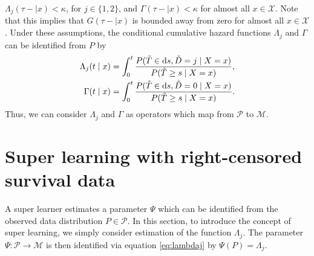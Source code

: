 \documentclass[a4,danish]{article}
\begin{document}
\(\Lambda_{j}(\tau- \mid x)<\kappa \), for \(j\in\{1,2\}\), and
\(\Gamma(\tau- \mid x)<\kappa\) for almost all \(x\in\mathcal X\). Note that this
implies that \(G(\tau- \mid x)\) is bounded away from zero for almost all \(x\in\mathcal X\).
Under these assumptions, the conditional cumulative hazard functions
\(\Lambda_{j}\) and \(\Gamma\) can be identified from \(P\) by
\begin{align}
  \Lambda_{j}(t \mid x) &= \int_0^t\frac{  P(\tilde T \in \mathop{}\!\mathrm{d} s, \tilde D=j \mid X=x )}{P(\tilde T \geq s \mid X=x )}, \label{eq:lambdaj}\\
  \Gamma(t \mid x) &= \int_0^t\frac{  P(\tilde T \in \mathop{}\!\mathrm{d} s, \tilde D=0 \mid X=x )}{P(\tilde T \geq s \mid X=x )}\label{eq:gamma}.
\end{align}
Thus, we can consider $\Lambda_j$ and \(\Gamma\) as operators which map from
\( \mathcal{P} \) to \(\mathcal M\).
 
\section{Super learning with right-censored survival data}
\label{sec:super-learning}

A super learner estimates a parameter $\Psi$ which can be identified from the
observed data distribution \(P\in\mathcal P\). In this section, to introduce the
concept of super learning, we simply consider estimation of the function
\( \Lambda_{j}\). The parameter \(\Psi:\mathcal P\to\mathcal M\) is then
identified via equation \eqref{eq:lambdaj} by \(\Psi(P)=\Lambda_j\).
\end{document}
